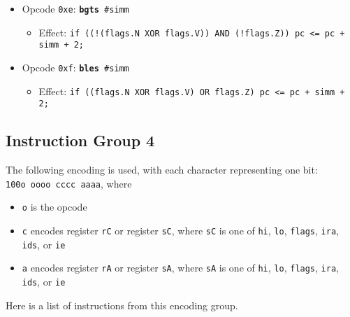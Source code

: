\documentclass{article}
\begin{document}
\begin{itemize}
		\item Opcode \texttt{0xe}:
			\texttt{\textbf{bgts} \#simm}
		\begin{itemize}
			\item Effect:
				\texttt{if ((!(flags.N XOR flags.V)) AND (!flags.Z))
					pc <= pc + simm + 2;}
		\end{itemize}

		\item Opcode \texttt{0xf}:
			\texttt{\textbf{bles} \#simm}
		\begin{itemize}
			\item Effect:
				\texttt{if ((flags.N XOR flags.V) OR flags.Z)
					pc <= pc + simm + 2;}
		\end{itemize}
	\end{itemize}

	\doublespacing
	\subsection{Instruction Group 4}
	The following encoding is used, with each character representing one
	bit:  \\
	\texttt{100o oooo cccc aaaa}, where

	\singlespacing
	\begin{itemize}
		\item \texttt{o} is the opcode
		\item \texttt{c} encodes register \texttt{rC} or register
		\texttt{sC}, where \texttt{sC} is one of \texttt{hi}, \texttt{lo},
		\texttt{flags}, \texttt{ira}, \texttt{ids}, or \texttt{ie}
		\item \texttt{a} encodes register \texttt{rA} or register
		\texttt{sA}, where \texttt{sA} is one of \texttt{hi}, \texttt{lo},
		\texttt{flags}, \texttt{ira}, \texttt{ids}, or \texttt{ie}
	\end{itemize}
	\doublespacing

	Here is a list of instructions from this encoding group.
\end{document}
